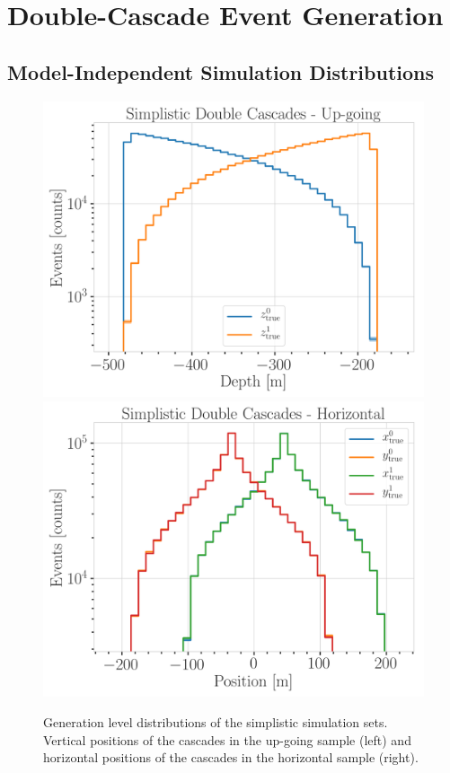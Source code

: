 
\chapter{Double-Cascade Event Generation}


\section{Model-Independent Simulation Distributions} 

\begin{figure}[h]
    \centering
    \includegraphics[width=0.49\linewidth]{figures/model_independent_simulation/gen_level/up_going_simplistic_1_d_distr_depth.png}
    \includegraphics[width=0.49\linewidth]{figures/model_independent_simulation/gen_level/horizontal_simplistic_1_d_distr_position.png}
    \caption[Simplified model independent simulation generation level distributions]{Generation level distributions of the simplistic simulation sets. Vertical positions of the cascades in the up-going sample (left) and horizontal positions of the cascades in the horizontal sample (right).}
\end{figure}

